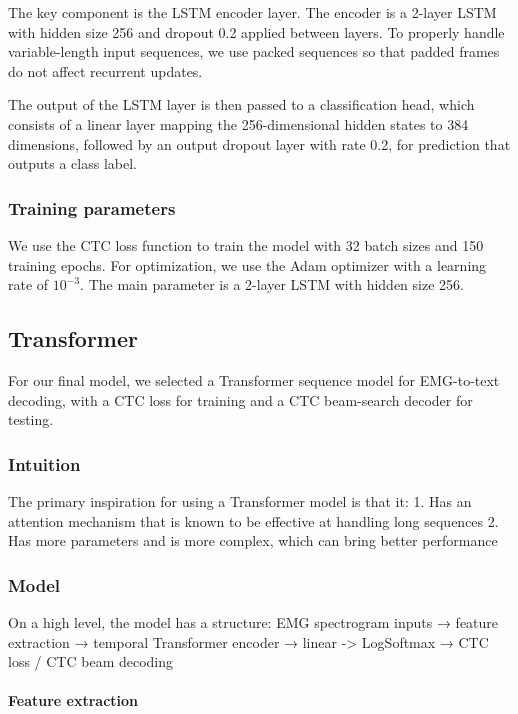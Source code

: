\documentclass{article}
\begin{document}
The key component is the LSTM encoder layer. The encoder is a 2-layer LSTM with hidden size 256 and dropout 0.2 applied between layers. To properly handle variable-length input sequences, we use packed sequences so that padded frames do not affect recurrent updates. 

The output of the LSTM layer is then passed to a classification head, which consists of a linear layer mapping the 256-dimensional hidden states to 384 dimensions, followed by an output dropout layer with rate 0.2, for prediction that outputs a class label.

\subsubsection{Training parameters}

We use the CTC loss function to train the model with 32 batch sizes and 150 training epochs. For optimization, we use the Adam optimizer with a learning rate of $10^{-3}$. The main parameter is a 2-layer LSTM with hidden size 256.

\subsection{Transformer}

For our final model, we selected a Transformer sequence model for EMG-to-text decoding, with a CTC loss for training and a CTC beam-search decoder for testing. 

\subsubsection{Intuition}

The primary inspiration for using a Transformer model is that it:
1. Has an attention mechanism that is known to be effective at handling long sequences
2. Has more parameters and is more complex, which can bring better performance

\subsubsection{Model}



On a high level, the model has a structure:
EMG spectrogram inputs → feature extraction → temporal Transformer encoder → linear -> LogSoftmax → CTC loss / CTC beam decoding

\paragraph{Feature extraction}
\end{document}
